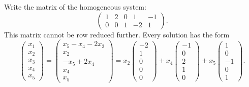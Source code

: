 \documentclass{ximera}
\begin{document}
\begin{exercise}
\begin{solution}
\soln Write the matrix of the homogeneous system:
\[
\left(\begin{array}{rrrrr} 1 & 2 & 0 & 1 & -1 \\
0 & 0 & 1 & -2 & 1 \end{array}\right).
\]
This matrix cannot be row reduced further.  Every solution has the form
\[
\left(\begin{array}{r} x_1 \\ x_2 \\ x_3 \\ x_4 \\ x_5
\end{array}\right) = \left(\begin{array}{c} x_5 - x_4 - 2x_2 \\
x_2 \\ -x_5 + 2x_4 \\ x_4 \\ x_5 \end{array}\right) = 
x_2\left(\begin{array}{r} -2 \\ 1 \\ 0 \\ 0 \\ 0
\end{array}\right) + x_4\left(\begin{array}{r} -1 \\ 0 \\ 2 \\
1 \\ 0 \end{array}\right) + x_5\left(\begin{array}{r} 1 \\ 0 \\
-1 \\ 0 \\ 1 \end{array}\right).
\]

\end{solution}
\end{exercise}
\end{document}
